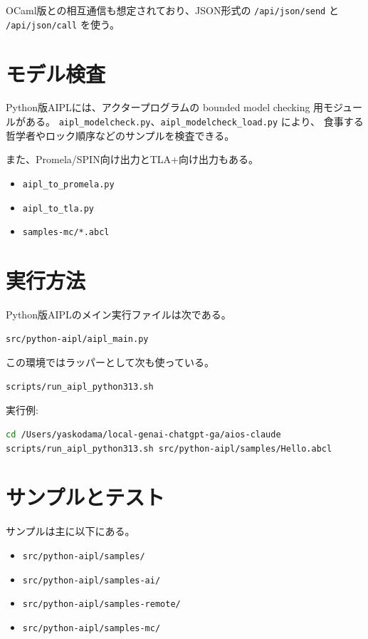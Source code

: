 \documentclass[11pt,a4paper,uplatex,dvipdfmx]{jsarticle}
\begin{document}
OCaml版との相互通信も想定されており、JSON形式の
\texttt{/api/json/send} と \texttt{/api/json/call} を使う。

\section{モデル検査}

Python版AIPLには、アクタープログラムの bounded model checking 用モジュールがある。
\texttt{aipl\_modelcheck.py}、\texttt{aipl\_modelcheck\_load.py} により、
食事する哲学者やロック順序などのサンプルを検査できる。

また、Promela/SPIN向け出力とTLA+向け出力もある。

\begin{itemize}
  \item \texttt{aipl\_to\_promela.py}
  \item \texttt{aipl\_to\_tla.py}
  \item \texttt{samples-mc/*.abcl}
\end{itemize}

\section{実行方法}

Python版AIPLのメイン実行ファイルは次である。

\begin{lstlisting}[style=aipl]
src/python-aipl/aipl_main.py
\end{lstlisting}

この環境ではラッパーとして次も使っている。

\begin{lstlisting}[style=aipl]
scripts/run_aipl_python313.sh
\end{lstlisting}

実行例:

\begin{lstlisting}[style=aipl,language=bash]
cd /Users/yaskodama/local-genai-chatgpt-ga/aios-claude
scripts/run_aipl_python313.sh src/python-aipl/samples/Hello.abcl
\end{lstlisting}

\section{サンプルとテスト}

サンプルは主に以下にある。

\begin{itemize}
  \item \texttt{src/python-aipl/samples/}
  \item \texttt{src/python-aipl/samples-ai/}
  \item \texttt{src/python-aipl/samples-remote/}
  \item \texttt{src/python-aipl/samples-mc/}
\end{itemize}
\end{document}
